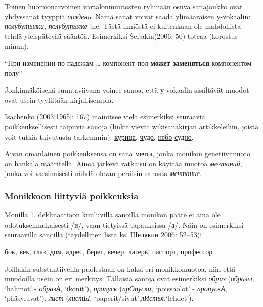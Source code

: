 \documentclass[]{scrartcl}
\begin{document}
Toinen huomionarvoinen vartalonmuutosten ryhmään osuva sanajoukko ovat
yhdyssanat tyyppiä \emph{полдень}. Nämä sanat voivat saada ylimääräisen
у-vokaalin: \emph{полубутылки}, \emph{полубутылке} jne. Tästä ilmiöstä
ei kuitenkaan ole mahdollista tehdä yleispätevää sääntöä. Esimerkiksi
Šeljakin(2006: 50) toteaa (korostus minun):

``При изменении по падежам \ldots{} компонент пол \textbf{может
заменяться} компонентом полу''

Jonkinnäköisenä suuntaviivana voinee sanoa, että у-vokaalin sisältävät
muodot ovat usein tyyliltään kirjallisempia.

Isachenko (2003{[}1965{]}: 167) mainitsee vielä esimerkiksi seuraavia
poikkeuksellisesti taipuvia sanoja (linkit vievät wikisanakirjan
artikkeleihin, joista voit tutkia taivutusta tarkemmin):
\href{https://ru.wiktionary.org/wiki/курица}{курица},
\href{https://ru.wiktionary.org/wiki/чудо}{чудо},
\href{https://ru.wiktionary.org/wiki/небо}{небо}
\href{https://ru.wiktionary.org/wiki/судно}{судно}.

Aivan omanlainen poikkeuksensa on sana
\href{https://ru.wiktionary.org/wiki/мечта}{мечта}, jonka monikon
genetiivimuoto on hankala määritellä. Ainoa järkevä ratkaisu on käyttää
muotoa \emph{мечтаний}, jonka voi varsinaisesti nähdä olevan peräisin
sanasta \emph{мечтание}.

\subsubsection{Monikkoon liittyviä
poikkeuksia}\label{monikkoon-liittyviuxe4-poikkeuksia}

Monilla 1. deklinaatioon kuuluvilla sanoilla monikon pääte ei aina ole
odotuksenmukaisesti /и/, vaan tietyissä tapauksissa /а/. Näin on
esimerkiksi seuraavilla sanoilla (täydellinen lista ks. Шелякин 2006:
52--53):

\href{https://ru.wiktionary.org/wiki/бок}{бок},
\href{https://ru.wiktionary.org/wiki/век}{век},
\href{https://ru.wiktionary.org/wiki/глаз}{глаз},
\href{https://ru.wiktionary.org/wiki/дом}{дом},
\href{https://ru.wiktionary.org/wiki/адрес}{адрес},
\href{https://ru.wiktionary.org/wiki/берег}{берег},
\href{https://ru.wiktionary.org/wiki/вечер}{вечер},
\href{https://ru.wiktionary.org/wiki/лагерь}{лагерь},
\href{https://ru.wiktionary.org/wiki/паспорт}{паспорт},
\href{https://ru.wiktionary.org/wiki/профессор}{профессор}

Joillakin substantiiveilla puolestaan on kaksi eri monikkomuotoa, niin
että muodoilla usein on eri merkitys. Tällaisia sanoja ovat esimerkiksi
\emph{образ} (\emph{образы}, `hahmot' - \emph{образА}, `ikonit'),
\emph{пропуск} (\emph{прОпуски}, `poissaolot' - \emph{пропускА},
`pääsyluvat'), \emph{лист} (\emph{листЫ},
`paperit/sivut',\emph{лИстья},`lehdet').
\end{document}
